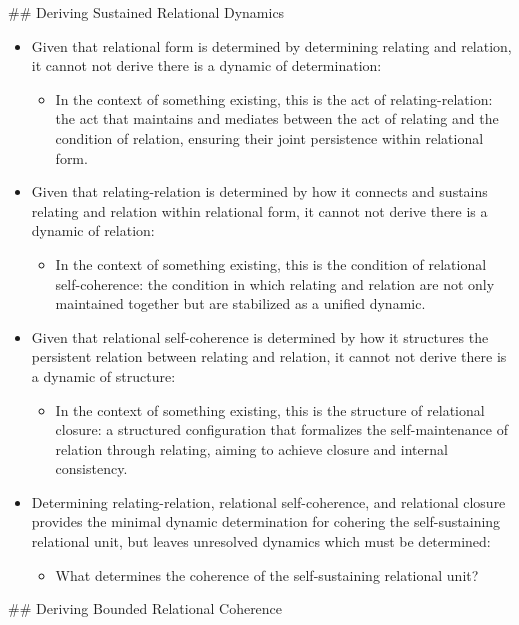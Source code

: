 \documentclass[11pt]{article}
\begin{document}
\#\# Deriving Sustained Relational Dynamics
\begin{itemize}
\item Given that relational form is determined by determining relating and relation, it cannot not derive there is a dynamic of determination:
\begin{itemize}
\item In the context of something existing, this is the act of relating-relation: the act that maintains and mediates between the act of relating and the condition of relation, ensuring their joint persistence within relational form.
\end{itemize}
\item Given that relating-relation is determined by how it connects and sustains relating and relation within relational form, it cannot not derive there is a dynamic of relation:
\begin{itemize}
\item In the context of something existing, this is the condition of relational self-coherence: the condition in which relating and relation are not only maintained together but are stabilized as a unified dynamic.
\end{itemize}

\item Given that relational self-coherence is determined by how it structures the persistent relation between relating and relation, it cannot not derive there is a dynamic of structure:

\begin{itemize}
\item In the context of something existing, this is the structure of relational closure: a structured configuration that formalizes the self-maintenance of relation through relating, aiming to achieve closure and internal consistency.
\end{itemize}

\item Determining relating-relation, relational self-coherence, and relational closure provides the minimal dynamic determination for cohering the self-sustaining relational unit, but leaves unresolved dynamics which must be determined:

\begin{itemize}
\item What determines the coherence of the self-sustaining relational unit?
\end{itemize}
\end{itemize}
\#\# Deriving Bounded Relational Coherence
\end{document}
